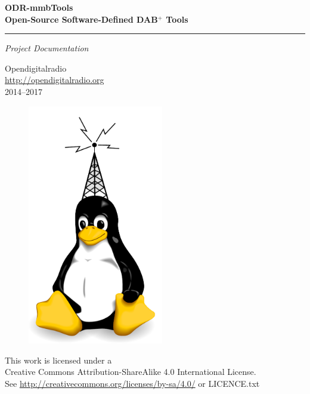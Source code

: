 \documentclass[a4paper,oneside,10pt]{article}
\newcommand{\dabplus}{DAB$^\mathrm{+}$\xspace}
\newcommand{\titleinfo}{ODR-mmbTools \\
Open-Source Software-Defined \dabplus Tools}
\begin{document}
 \begin{titlepage}
    \null\vfil
    \begin{flushleft}
      \huge \textbf{\titleinfo}
    \end{flushleft}
    \par
    \hrule height 4pt
    \par
    \begin{flushright}
      \large
      \textsl{Project Documentation} \par
    \end{flushright}
    \vspace{\fill}

    \begin{center}
        \Large
        Opendigitalradio\\\href{http://opendigitalradio.org}{http://opendigitalradio.org}\\2014--2017
    \end{center}
    \vspace{\fill}

    \begin{figure}[!h]
        \centering
        \parbox{2.2in}{\includegraphics[width=16em]{figures/dabtux.pdf}}
    \end{figure}

    \vspace*{1cm}
    \begin{center}
    This work is licensed under a \\
    Creative Commons Attribution-ShareAlike 4.0 International License.\\
    See \url{http://creativecommons.org/licenses/by-sa/4.0/} or LICENCE.txt
    \end{center}
 \end{titlepage}
\end{document}
